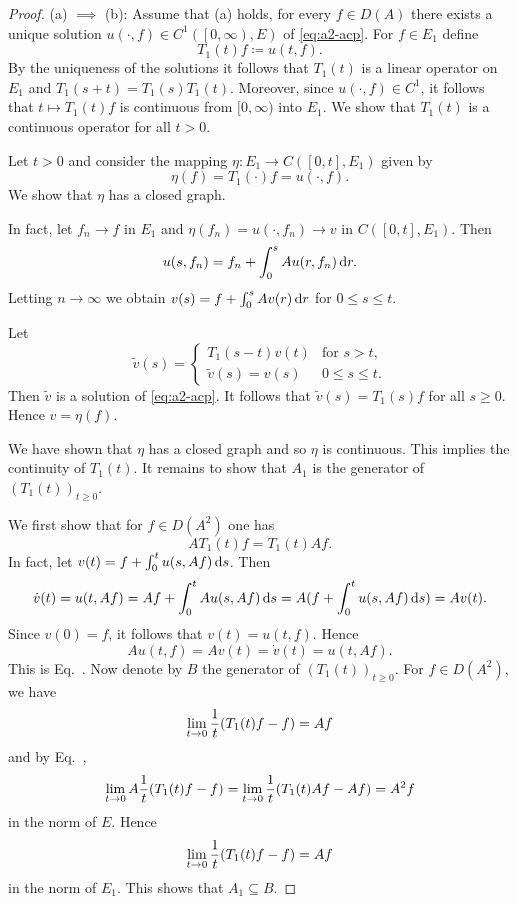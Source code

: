 \begin{proof} (a) $\implies$ (b):   
Assume that (a) holds, \ie for every $f \in D(A)$ there exists a unique solution $u(\cdot,f) \in C^{1}(\left[0,\infty\right),E)$ of \eqref{eq:a2-acp}.
For $f \in E_{1}$ define 
\[
T_{1}(t)f \coloneq u(t,f) .
\]
By the uniqueness of the solutions it follows that $T_{1}(t)$ is a linear operator on $E_{1}$ and $T_{1}(s+t) = T_{1}(s)T_{1}(t)$.
Moreover, since $u(\cdot,f) \in C^{1}$, it follows that $t \mapsto T_{1}(t)f$ is continuous from $[0,\infty)$ into $E_{1}$.
We show that $T_{1}(t)$ is a continuous operator for all $t > 0$.

Let $t > 0$ and consider the mapping $\eta \colon E_{1} \to C([0,t],E_{1})$ given by 
\[
    \eta(f) = T_{1}(\cdot)f = u(\cdot,f) .
\]
We show that $\eta$ has a closed graph.

In fact, let $f_{n} \to f$ in $E_{1}$ and $\eta(f_{n}) = u(\cdot,f_{n}) \to v$ in $C([0,t],E_{1})$.
Then 
\[
u(s,f_{n}) = f_{n} + \int_{0}^{s} Au(r,f_{n}) \mathop{}\!\mathrm{d}{r} .
\]
Letting $n \to \infty$ we obtain $v(s) = f + \int_{0}^{s} Av(r) \mathop{}\!\mathrm{d}{r}$ for $0 \leq s \leq t$.

Let 
\[
\tilde{v}(s) = 
\begin{cases}
    T_{1}(s-t)v(t)      & \text{for $s > t$,}\\
    \tilde{v}(s) = v(s) & \text{$0 \leq s \leq t$.}
\end{cases}
\]
Then $\tilde{v}$ is a solution of \eqref{eq:a2-acp}.
It follows that $\tilde{v}(s) = T_{1}(s)f$ for all $s \geq 0$.
Hence $v = \eta(f)$.

We have shown that $\eta$ has a closed graph and so $\eta$ is continuous.
This implies the continuity of\/ $T_{1}(t)$.
It remains to show that $A_{1}$ is the generator of\/ $(T_{1}(t))_{t \geq 0}$.

We first show that for $f \in D(A^{2})$ one has
\begin{equation}\label{eq:a2-1.1}
AT_{1}(t)f = T_{1}(t)Af.
\end{equation}
In fact, let $v(t) = f + \int_{0}^{t} u(s,Af) \mathop{}\!\mathrm{d}{s}$.
Then 
\[
\dot{v}(t) = u(t,Af) = Af + \int_{0}^{t} Au(s,Af) \mathop{}\!\mathrm{d}{s} = A(f + \int_{0}^{t} u(s,Af) \mathop{}\!\mathrm{d}{s}) = Av(t). 
\]
Since $v(0) = f$, it follows that $v(t) = u(t,f)$.
Hence 
%
\[
	Au(t,f) = Av(t) = \dot{v}(t) = u(t,Af) .
\]
%
This is Eq.~.
Now denote by $B$ the generator of\/ $(T_{1}(t))_{t \geq 0}$.
For $f \in D(A^{2})$, we have
\[
    \lim_{t \to 0} \frac{1}{t}\mleft( T_{1}(t)f - f \mright) = Af
\]
and by Eq.~,
\[
    \lim_{t \to 0} A\frac{1}{t} \mleft( T_{1}(t)f - f \mright) = 
    \lim_{t \to 0} \frac{1}{t} \mleft( T_{1}(t)Af - Af \mright)
    = A^{2}f
\]
in the norm of\/ $E$.
Hence 
\[ 
\lim_{t \to 0} \frac{1}{t} \mleft( T_{1}(t)f - f \mright) = Af
\]
in the norm of\/ $E_{1}$.
This shows that $A_{1} \subseteq B$.


\end{proof}
